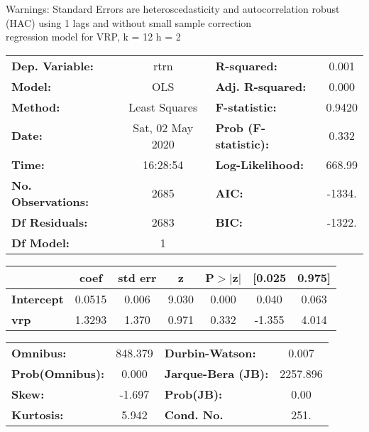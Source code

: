 Warnings: \newline
 [1] Standard Errors are heteroscedasticity and autocorrelation robust (HAC) using 1 lags and without small sample correction\\ 

regression model for VRP, k = 12 h = 2\begin{center}
\begin{tabular}{lclc}
\toprule
\textbf{Dep. Variable:}    &       rtrn       & \textbf{  R-squared:         } &     0.001   \\
\textbf{Model:}            &       OLS        & \textbf{  Adj. R-squared:    } &     0.000   \\
\textbf{Method:}           &  Least Squares   & \textbf{  F-statistic:       } &    0.9420   \\
\textbf{Date:}             & Sat, 02 May 2020 & \textbf{  Prob (F-statistic):} &    0.332    \\
\textbf{Time:}             &     16:28:54     & \textbf{  Log-Likelihood:    } &    668.99   \\
\textbf{No. Observations:} &        2685      & \textbf{  AIC:               } &    -1334.   \\
\textbf{Df Residuals:}     &        2683      & \textbf{  BIC:               } &    -1322.   \\
\textbf{Df Model:}         &           1      & \textbf{                     } &             \\
\bottomrule
\end{tabular}
\begin{tabular}{lcccccc}
                   & \textbf{coef} & \textbf{std err} & \textbf{z} & \textbf{P$> |$z$|$} & \textbf{[0.025} & \textbf{0.975]}  \\
\midrule
\textbf{Intercept} &       0.0515  &        0.006     &     9.030  &         0.000        &        0.040    &        0.063     \\
\textbf{vrp}       &       1.3293  &        1.370     &     0.971  &         0.332        &       -1.355    &        4.014     \\
\bottomrule
\end{tabular}
\begin{tabular}{lclc}
\textbf{Omnibus:}       & 848.379 & \textbf{  Durbin-Watson:     } &    0.007  \\
\textbf{Prob(Omnibus):} &   0.000 & \textbf{  Jarque-Bera (JB):  } & 2257.896  \\
\textbf{Skew:}          &  -1.697 & \textbf{  Prob(JB):          } &     0.00  \\
\textbf{Kurtosis:}      &   5.942 & \textbf{  Cond. No.          } &     251.  \\
\bottomrule
\end{tabular}
\end{center}

